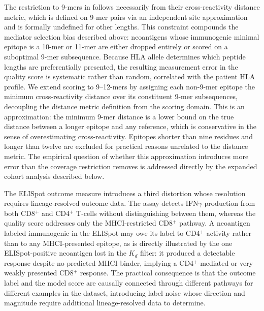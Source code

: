 \documentclass[11pt]{article}
\begin{document}
The restriction to 9-mers in \citep{rojas2023personalized} follows
necessarily from their cross-reactivity distance metric, which
is defined on 9-mer pairs via an independent site
approximation and is formally undefined for other lengths.
This constraint compounds the mediator selection bias described
above: neoantigens whose immunogenic minimal epitope is a
10-mer or 11-mer are either dropped entirely or scored on a
suboptimal 9-mer subsequence.
Because HLA allele determines which peptide lengths are
preferentially presented, the resulting measurement error in
the quality score is systematic rather than random, correlated
with the patient HLA profile.
We extend scoring to 9--12-mers by assigning each non-9-mer
epitope the minimum cross-reactivity distance over its
constituent 9-mer subsequences, decoupling the distance metric
definition from the scoring domain.
This is an approximation: the minimum 9-mer distance is a
lower bound on the true distance between a longer epitope and
any reference, which is conservative in the sense of
overestimating cross-reactivity.
Epitopes shorter than nine residues and longer than twelve
are excluded for practical reasons unrelated to the distance
metric.
The empirical question of whether this approximation introduces
more error than the coverage restriction removes is addressed
directly by the expanded cohort analysis described below.

The ELISpot outcome measure introduces a third distortion whose resolution
requires lineage-resolved outcome data.
The assay detects IFN$\gamma$ production from both CD8$^{+}$
and CD4$^{+}$ T-cells without distinguishing between them,
whereas the quality score addresses only the MHCI-restricted
CD8$^{+}$ pathway.
A neoantigen labeled immunogenic in the ELISpot may owe its
label to CD4$^{+}$ activity rather than to any MHCI-presented
epitope, as is directly illustrated by the one ELISpot-positive
neoantigen lost in the $K_d$ filter: it produced a detectable
response despite no predicted MHCI binder, implying a
CD4$^{+}$-mediated or very weakly presented CD8$^{+}$
response.
The practical consequence is that the outcome label and the
model score are causally connected through different pathways
for different examples in the dataset, introducing label noise
whose direction and magnitude require additional lineage-resolved data to
determine.
\end{document}
